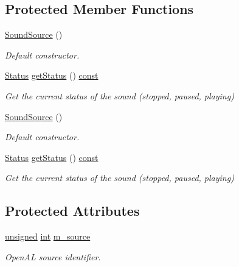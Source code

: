 \subsection*{Protected Member Functions}
\begin{DoxyCompactItemize}
\item 
\hyperlink{classsf_1_1_sound_source_aefa4bd4460f387d81a0637d293979436}{Sound\-Source} ()
\begin{DoxyCompactList}\small\item\em Default constructor. \end{DoxyCompactList}\item 
\hyperlink{classsf_1_1_sound_source_ac43af72c98c077500b239bc75b812f03}{Status} \hyperlink{classsf_1_1_sound_source_ad1995d2888773f47f99b671747609dbb}{get\-Status} () \hyperlink{term__entry_8h_a57bd63ce7f9a353488880e3de6692d5a}{const} 
\begin{DoxyCompactList}\small\item\em Get the current status of the sound (stopped, paused, playing) \end{DoxyCompactList}\item 
\hyperlink{classsf_1_1_sound_source_aefa4bd4460f387d81a0637d293979436}{Sound\-Source} ()
\begin{DoxyCompactList}\small\item\em Default constructor. \end{DoxyCompactList}\item 
\hyperlink{classsf_1_1_sound_source_ac43af72c98c077500b239bc75b812f03}{Status} \hyperlink{classsf_1_1_sound_source_ad1995d2888773f47f99b671747609dbb}{get\-Status} () \hyperlink{term__entry_8h_a57bd63ce7f9a353488880e3de6692d5a}{const} 
\begin{DoxyCompactList}\small\item\em Get the current status of the sound (stopped, paused, playing) \end{DoxyCompactList}\end{DoxyCompactItemize}
\subsection*{Protected Attributes}
\begin{DoxyCompactItemize}
\item 
\hyperlink{curses_8priv_8h_aca40206900cfc164654362fa8d4ad1e6}{unsigned} \hyperlink{term__entry_8h_ad65b480f8c8270356b45a9890f6499ae}{int} \hyperlink{classsf_1_1_sound_source_a0223cef4b1c587e6e1e17b4c92c4479c}{m\-\_\-source}
\begin{DoxyCompactList}\small\item\em Open\-A\-L source identifier. \end{DoxyCompactList}\end{DoxyCompactItemize}


